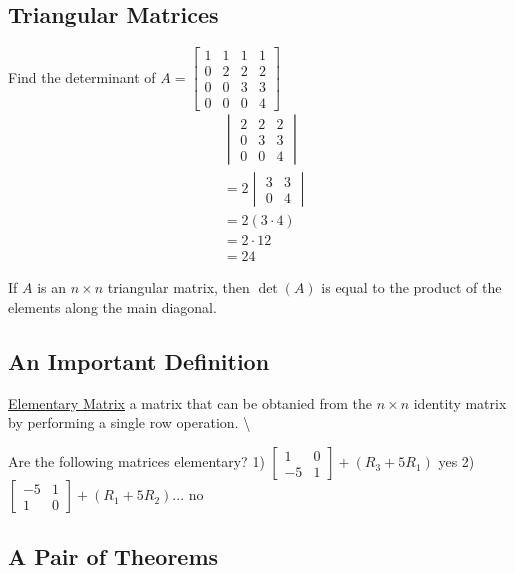 \documentclass[
  letterpaper,
  DIV=11,
  numbers=noendperiod]{scrartcl}
\begin{document}
\subsection{Triangular Matrices}\label{triangular-matrices}

Find the determinant of
\(A = \begin{bmatrix}1 & 1 & 1 & 1 \\ 0 & 2 & 2 & 2 \\ 0 & 0 & 3 & 3 \\ 0 & 0 & 0 & 4\end{bmatrix}\)
\begin{align*}
&\begin{vmatrix}2 & 2 & 2 \\ 0 & 3 & 3 \\ 0 & 0 & 4\end{vmatrix} \\
&= 2\begin{vmatrix}3 & 3 \\ 0 & 4\end{vmatrix} \\
&= 2(3\cdot4) \\
&= 2\cdot12 \\
&=24
\end{align*}

If \(A\) is an \(n \times n\) triangular matrix, then \(\det(A)\) is
equal to the product of the elements along the main diagonal.

\subsection{An Important Definition}\label{an-important-definition}

\ul{Elementary Matrix} a matrix that can be obtanied from the
\(n \times n\) identity matrix by performing a single row operation.
\textbackslash{}

Are the following matrices elementary? 1)
\(\begin{bmatrix}1 & 0 \\ -5 & 1\end{bmatrix}+(R_3+5R_1)\) yes 2)
\(\begin{bmatrix}-5 & 1 \\ 1 & 0\end{bmatrix}+(R_1+5R_2)...\) no

\subsection{A Pair of Theorems}\label{a-pair-of-theorems}
\end{document}

